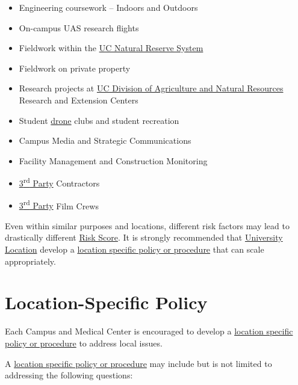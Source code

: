 \documentclass[
]{book}
\providecommand{\tightlist}{%
  \setlength{\itemsep}{0pt}\setlength{\parskip}{0pt}}
\begin{document}
\begin{itemize}
\tightlist
\item
  Engineering coursework -- Indoors and Outdoors
\item
  On-campus UAS research flights
\item
  Fieldwork within the \protect\hyperlink{NRS}{UC Natural Reserve System}
\item
  Fieldwork on private property
\item
  Research projects at \protect\hyperlink{ANR}{UC Division of Agriculture and Natural Resources} Research and Extension Centers
\item
  Student \protect\hyperlink{drone}{drone} clubs and student recreation
\item
  Campus Media and Strategic Communications
\item
  Facility Management and Construction Monitoring
\item
  \protect\hyperlink{rdparty}{3\textsuperscript{rd} Party} Contractors
\item
  \protect\hyperlink{rdparty}{3\textsuperscript{rd} Party} Film Crews
\end{itemize}

Even within similar purposes and locations, different risk factors may lead to drastically different \protect\hyperlink{riskscore}{Risk Score}. It is strongly recommended that \protect\hyperlink{UL}{University Location} develop a \protect\hyperlink{LSP}{location specific policy or procedure} that can scale appropriately.

\hypertarget{sec_LSP}{%
\section{Location-Specific Policy}\label{sec_LSP}}

Each Campus and Medical Center is encouraged to develop a \protect\hyperlink{LSP}{location specific policy or procedure} to address local issues.

A \protect\hyperlink{LSP}{location specific policy or procedure} may include but is not limited to addressing the following questions:
\end{document}
